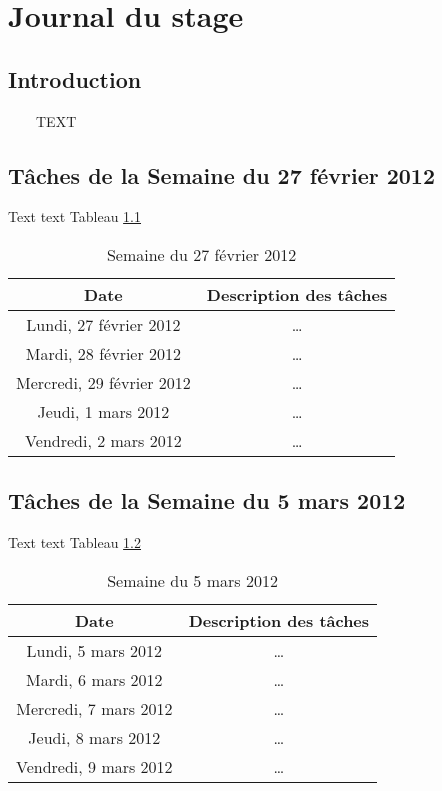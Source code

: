 \chapter{Journal du stage}
\section{Introduction}
~~~~TEXT
\section{T\^{a}ches de la Semaine du 27 f\'{e}vrier 2012}
Text text Tableau \ref{week1}
\begin{table}[!h]
\begin{center}
\caption{Semaine du 27 f\'{e}vrier 2012} \label{week1}
\begin{tabular}{|c|c|}
  \hline
 \textbf{Date}  & \textbf{Description des t\^{a}ches} \\ \hline
  Lundi, 27 f\'{e}vrier 2012 & \ldots \\ \hline
  Mardi, 28 f\'{e}vrier 2012 & \ldots \\ \hline
  Mercredi, 29 f\'{e}vrier 2012 & \ldots \\ \hline
  Jeudi, 1 mars 2012 & \ldots \\ \hline
  Vendredi, 2 mars 2012 & \ldots \\
  \hline
\end{tabular}
\end{center}
\end{table}
\section{T\^{a}ches de la Semaine du 5 mars 2012}
Text text Tableau \ref{week2}
\begin{table}[!h]
\begin{center}
\caption{Semaine du 5 mars 2012} \label{week2}
\begin{tabular}{|c|c|}
  \hline
 \textbf{Date}  & \textbf{Description des t\^{a}ches} \\ \hline
  Lundi, 5 mars 2012 & \ldots \\ \hline
  Mardi, 6 mars 2012 & \ldots \\ \hline
  Mercredi, 7 mars 2012 & \ldots \\ \hline
  Jeudi, 8 mars 2012 & \ldots \\ \hline
  Vendredi, 9 mars 2012 & \ldots \\
  \hline
\end{tabular}
\end{center}
\end{table}
